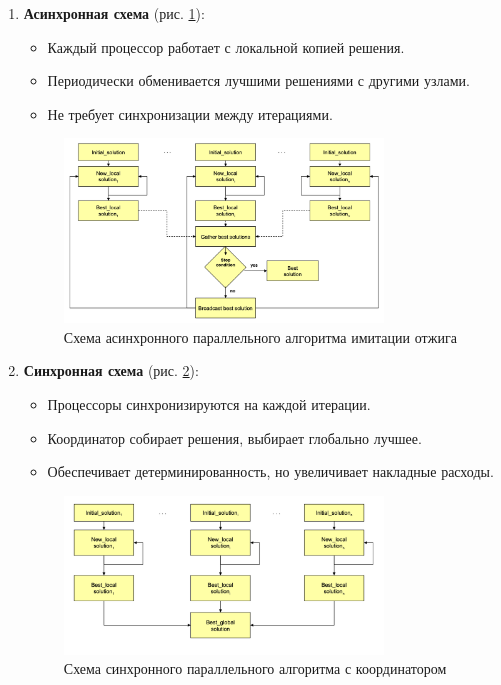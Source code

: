 \begin{enumerate}
    \item \textbf{Асинхронная схема} (рис. \ref{fig:async}):
    \begin{itemize}
        \item Каждый процессор работает с локальной копией решения.
        \item Периодически обменивается лучшими решениями с другими узлами.
        \item Не требует синхронизации между итерациями.
    \end{itemize}

    \begin{figure}[H]
        \centering
        \includegraphics[width=0.8\textwidth]{pics/IOpar1.png}
        \caption{Схема асинхронного параллельного алгоритма имитации отжига}
        \label{fig:async}
    \end{figure}

    \item \textbf{Синхронная схема} (рис. \ref{fig:sync}):
    \begin{itemize}
        \item Процессоры синхронизируются на каждой итерации.
        \item Координатор собирает решения, выбирает глобально лучшее.
        \item Обеспечивает детерминированность, но увеличивает накладные расходы.
    \end{itemize}

    \begin{figure}[H]
        \centering
        \includegraphics[width=0.8\textwidth]{pics/IOpar2.png}
        \caption{Схема синхронного параллельного алгоритма с координатором}
        \label{fig:sync}
    \end{figure}
\end{enumerate}

